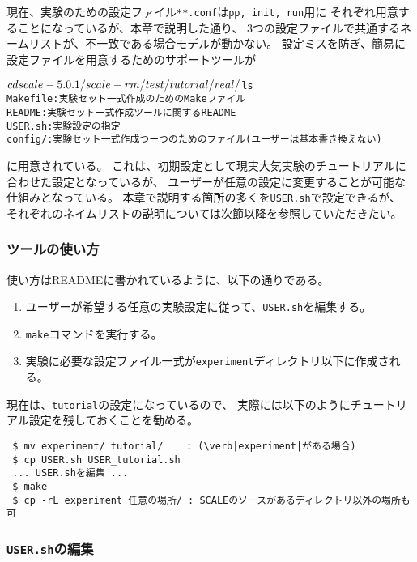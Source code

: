\section{\SecMakeconfTool} \label{sec:basic_makeconf}

現在、実験のための設定ファイル\verb|**.conf|は\verb|pp, init, run|用に
それぞれ用意することになっているが、本章で説明した通り、
3つの設定ファイルで共通するネームリストが、不一致である場合モデルが動かない。
設定ミスを防ぎ、簡易に設定ファイルを用意するためのサポートツールが
\begin{alltt}
 $ cd scale-{\version}/scale-rm/test/tutorial/real/
 $ ls 
    Makefile : 実験セット一式作成のためのMakeファイル
    README   : 実験セット一式作成ツールに関するREADME
    USER.sh  : 実験設定の指定
    config/  : 実験セット一式作成つーつのためのファイル(ユーザーは基本書き換えない)
\end{alltt}
に用意されている。
これは、初期設定として現実大気実験のチュートリアルに合わせた設定となっているが、
ユーザーが任意の設定に変更することが可能な仕組みとなっている。
本章で説明する箇所の多くを\verb|USER.sh|で設定できるが、
それぞれのネイムリストの説明については次節以降を参照していただきたい。


\subsubsection{ツールの使い方}

使い方はREADMEに書かれているように、以下の通りである。
\begin{enumerate}
  \item ユーザーが希望する任意の実験設定に従って、\verb|USER.sh|を編集する。
  \item \verb|make|コマンドを実行する。
  \item 実験に必要な設定ファイル一式が\verb|experiment|ディレクトリ以下に作成される。
\end{enumerate}

現在は、\verb|tutorial|の設定になっているので、
実際には以下のようにチュートリアル設定を残しておくことを勧める。
\begin{verbatim}
 $ mv experiment/ tutorial/    : (\verb|experiment|がある場合)
 $ cp USER.sh USER_tutorial.sh
 ... USER.shを編集 ...
 $ make
 $ cp -rL experiment 任意の場所/ : SCALEのソースがあるディレクトリ以外の場所も可
\end{verbatim}


\subsubsection{\texttt{USER.sh}の編集}

